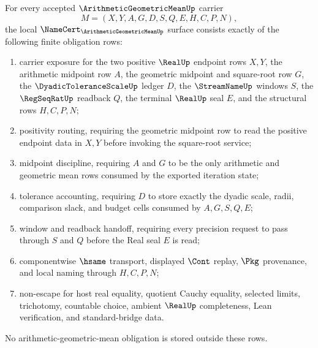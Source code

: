 \begin{theorem}
\label{thm:arithmetic-geometric-mean-namecert-obligations}
For every accepted $\ArithmeticGeometricMeanUp$ carrier
$$
M=(X,Y,A,G,D,S,Q,E,H,C,P,N),
$$
the local $\NameCert_{\ArithmeticGeometricMeanUp}$ surface consists exactly of the following finite obligation rows:
\begin{enumerate}
\item carrier exposure for the two positive $\RealUp$ endpoint rows $X,Y$, the arithmetic midpoint row $A$, the geometric midpoint and square-root row $G$, the $\DyadicToleranceScaleUp$ ledger $D$, the $\StreamNameUp$ windows $S$, the $\RegSeqRatUp$ readback $Q$, the terminal $\RealUp$ seal $E$, and the structural rows $H,C,P,N$;
\item positivity routing, requiring the geometric midpoint row to read the positive endpoint data in $X,Y$ before invoking the square-root service;
\item midpoint discipline, requiring $A$ and $G$ to be the only arithmetic and geometric mean rows consumed by the exported iteration state;
\item tolerance accounting, requiring $D$ to store exactly the dyadic scale, radii, comparison slack, and budget cells consumed by $A,G,S,Q,E$;
\item window and readback handoff, requiring every precision request to pass through $S$ and $Q$ before the Real seal $E$ is read;
\item componentwise $\hsame$ transport, displayed $\Cont$ replay, $\Pkg$ provenance, and local naming through $H,C,P,N$;
\item non-escape for host real equality, quotient Cauchy equality, selected limits, trichotomy, countable choice, ambient $\RealUp$ completeness, Lean verification, and standard-bridge data.
\end{enumerate}
No arithmetic-geometric-mean obligation is stored outside these rows.
\end{theorem}
